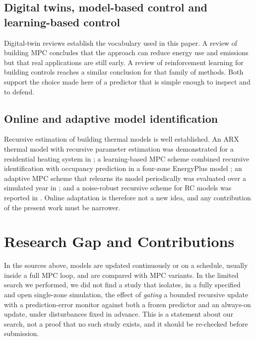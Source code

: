 \documentclass[conference]{IEEEtran}
\begin{document}
\subsection{Digital twins, model-based control and learning-based control}
Digital-twin reviews \cite{ibrahim2026,hodavand2023} establish the vocabulary used in this paper. A review of building MPC \cite{drgona2020} concludes that the approach can reduce energy use and emissions but that real applications are still early. A review of reinforcement learning for building controls \cite{wang2020} reaches a similar conclusion for that family of methods. Both support the choice made here of a predictor that is simple enough to inspect and to defend.

\subsection{Online and adaptive model identification}
Recursive estimation of building thermal models is well established. An ARX thermal model with recursive parameter estimation was demonstrated for a residential heating system in \cite{burger2017}; a learning-based MPC scheme combined recursive identification with occupancy prediction in a four-zone EnergyPlus model \cite{eini2019}; an adaptive MPC scheme that relearns its model periodically was evaluated over a simulated year in \cite{zeng2021}; and a noise-robust recursive scheme for RC models was reported in \cite{guo2025}. Online adaptation is therefore not a new idea, and any contribution of the present work must be narrower.

\section{Research Gap and Contributions}
In the sources above, models are updated continuously or on a schedule, usually inside a full MPC loop, and are compared with MPC variants. In the limited search we performed, we did not find a study that isolates, in a fully specified and open single-zone simulation, the effect of \emph{gating} a bounded recursive update with a prediction-error monitor against both a frozen predictor and an always-on update, under disturbances fixed in advance. This is a statement about our search, not a proof that no such study exists, and it should be re-checked before submission.
\end{document}

